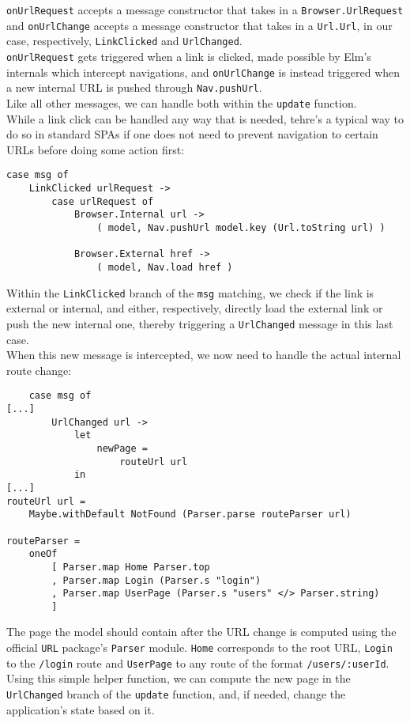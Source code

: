 \texttt{onUrlRequest} accepts a message constructor that takes in a \texttt{Browser.UrlRequest} and \texttt{onUrlChange} accepts a message constructor that takes in a \texttt{Url.Url}, in our case, respectively, \texttt{LinkClicked} and \texttt{UrlChanged}.\\
\texttt{onUrlRequest} gets triggered when a link is clicked, made possible by Elm's internals which intercept navigations, and \texttt{onUrlChange} is instead triggered when a new internal URL is pushed through \texttt{Nav.pushUrl}.\\
Like all other messages, we can handle both within the \texttt{update} function.\\

While a link click can be handled any way that is needed, tehre's a typical way to do so in standard SPAs if one does not need to prevent navigation to certain URLs before doing some action first\cite{noauthor_navigation_nodate}:
\begin{verbatim}
case msg of
    LinkClicked urlRequest ->
        case urlRequest of
            Browser.Internal url ->
                ( model, Nav.pushUrl model.key (Url.toString url) )

            Browser.External href ->
                ( model, Nav.load href )
\end{verbatim}

Within the \texttt{LinkClicked} branch of the \texttt{msg} matching, we check if the link is external or internal, and either, respectively, directly load the external link or push the new internal one, thereby triggering a \texttt{UrlChanged} message in this last case.\\

When this new message is intercepted, we now need to handle the actual internal route change:
\begin{verbatim}
    case msg of
[...]
        UrlChanged url ->
            let
                newPage =
                    routeUrl url
            in
[...]
routeUrl url =
    Maybe.withDefault NotFound (Parser.parse routeParser url)
    
routeParser =
    oneOf
        [ Parser.map Home Parser.top
        , Parser.map Login (Parser.s "login")
        , Parser.map UserPage (Parser.s "users" </> Parser.string)
        ]
\end{verbatim}
The page the model should contain after the URL change is computed using  the official \texttt{URL} package's \texttt{Parser} module. \texttt{Home} corresponds to the root URL, \texttt{Login} to the \texttt{/login} route and \texttt{UserPage} to any route of the format \texttt{/users/:userId}.\\
Using this simple helper function, we can compute the new page in the \texttt{UrlChanged} branch of the \texttt{update} function, and, if needed, change the application's state based on it.

